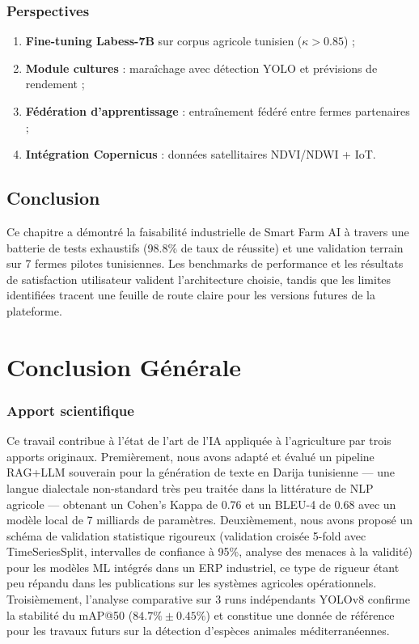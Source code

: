 \documentclass[12pt,a4paper,twoside]{report}
\newcounter{hi}
\begin{document}
\subsection{Perspectives}

\begin{enumerate}
  \item \textbf{Fine-tuning Labess-7B} sur corpus agricole tunisien ($\kappa > 0.85$) ;
  \item \textbf{Module cultures} : maraîchage avec détection YOLO et prévisions de rendement ;
  \item \textbf{Fédération d'apprentissage} : entraînement fédéré entre fermes partenaires ;
  \item \textbf{Intégration Copernicus} : données satellitaires NDVI/NDWI + IoT.
\end{enumerate}

\section*{Conclusion}
Ce chapitre a démontré la faisabilité industrielle de Smart Farm AI à travers
une batterie de tests exhaustifs (98.8\% de taux de réussite) et une validation
terrain sur 7 fermes pilotes tunisiennes. Les benchmarks de performance et
les résultats de satisfaction utilisateur valident l'architecture choisie,
tandis que les limites identifiées tracent une feuille de route claire pour
les versions futures de la plateforme.

\chapter*{Conclusion Générale}

\subsection*{Apport scientifique}
Ce travail contribue à l'état de l'art de l'IA appliquée à l'agriculture
par trois apports originaux. Premièrement, nous avons adapté et évalué
un pipeline RAG+LLM souverain pour la génération de texte en Darija
tunisienne — une langue dialectale non-standard très peu traitée dans
la littérature de NLP agricole — obtenant un Cohen's Kappa de 0.76 et
un BLEU-4 de 0.68 avec un modèle local de 7 milliards de paramètres.
Deuxièmement, nous avons proposé un schéma de validation statistique
rigoureux (validation croisée 5-fold avec TimeSeriesSplit, intervalles
de confiance à 95\%, analyse des menaces à la validité) pour les modèles
ML intégrés dans un ERP industriel, ce type de rigueur étant peu répandu
dans les publications sur les systèmes agricoles opérationnels. Troisièmement,
l'analyse comparative sur 3 runs indépendants YOLOv8 confirme la stabilité
du mAP@50 ($84.7\% \pm 0.45\%$) et constitue une donnée de référence pour
les travaux futurs sur la détection d'espèces animales méditerranéennes.
\end{document}
